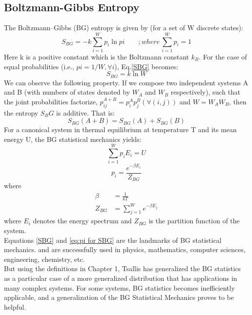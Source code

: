 \documentclass[11pt]{article}
\numberwithin{equation}{section}
\begin{document}
\subsection{Boltzmann-Gibbs Entropy}
The Boltzmann–Gibbs (BG) entropy is given by (for a set of W discrete states):
\begin{equation}
	S_{BG}=-k\sum_{i=1}^{W} p_i \ln pi \qquad ;where\, \sum_{i=1}^{W} p_i=1 \label{SBG}
\end{equation}
Here k is a positive constant which is the Boltzmann constant $k_B$. For the  case of equal probabilities (i.e., $pi =1/W, \forall i$), Eq.\ref{SBG} becomes:
\begin{equation}
	S_{BG}=k\ln W \label{SBG p=1/w}
\end{equation}
We can observe the following property. If we compose two independent systems A and B (with numbers of states denoted by $W_A$ and $W_B$ respectively), such that the joint probabilities factorize, $p_{ij}^{A+B} = p_i^A p_j^B (\forall (i, j))$ and $W=W_A W_B$, then the entropy $S_BG$ is additive. That is:
\begin{equation}
	S_{BG}(A+B)=S_{BG}(A)+S_{BG}(B) \label{sum property}
\end{equation}
For a canonical system in thermal equilibrium at temperature T and its mean energy U, the BG statistical mechanics yields:
\begin{equation}
	\sum_{i=1}^{W}p_i E_i=U	\label{constraint piei}
\end{equation}
\begin{equation}
	p_i=\frac{e^{-\beta E_i}}{Z_{BG}} \label{eq:pi for SBG}
\end{equation}
where
\begin{align}
	\beta&=\frac{1}{kT}\\
	Z_{BG}&=\sum_{j=1}^{W} e^{-\beta E_j} \label{eq:Zq for SBG}
\end{align}
where $E_i$ denotes the energy spectrum and $Z_{BG}$ is the partition function of the system.\\ Equations \eqref{SBG} and \eqref{eq:pi for SBG} are the landmarks of BG statistical mechanics. and are successfully used in physics, mathematics, computer sciences, engineering, chemistry, etc. \\
But using the definitions in Chapter 1, Tsallis has generalized the BG statistics as a particular case of a more generalized distribution that has applications in many complex systems. For some systems, BG statistics becomes inefficiently applicable, and a generalization of the BG Statistical Mechanics proves to be helpful.
\end{document}
